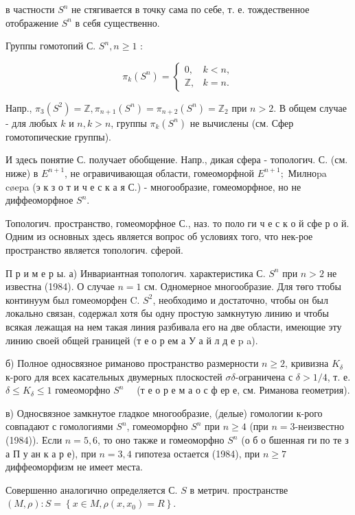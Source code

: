 \documentclass[10pt]{article}
\begin{document}
в частности $S^{n}$ не стягивается в точку сама по себе, т. е. тождественное отображение $S^{n}$ в себя существенно.



Группы гомотопий С. $S^{n}, n \geqslant 1$ :



\[

\pi_{k}\left(S^{n}\right)= \begin{cases}0, & k<n, \\ \mathbb{Z}, & k=n .\end{cases}

\]



Напр., $\pi_{3}\left(S^{2}\right)=\mathbb{Z}, \pi_{n+1}\left(S^{n}\right)=\pi_{n+2}\left(S^{n}\right)=\mathbb{Z}_{2}$ при $n>2$. В общем случае - для любых $k$ и $n, k>n$, группы $\pi_{k}\left(S^{n}\right)$ не вычислены (см. Сфер гомотопические группы).



И здесь понятие С. получает обобщение. Напр., дикая сфера - топологич. С. (см. ниже) в $E^{n+1}$, не огравичивающая области, гомеоморфной $E^{n+1} ;$ Милноpa cøepa (э к з о т и ч е с к а я С.) - многообразие, гомеоморфное, но не диффеоморфное $S^{n}$.



Топологич. пространство, гомеоморфное С., наз. то поло ги ч е с к о й сфе р о й. Одним из основных здесь является вопрос об условиях того, что нек-рое пространство является топологич. сферой.



П р и м е р ы. а) Инвариантная топологич. характеристика С. $S^{n}$ при $n>2$ не известна (1984). О случае $n=1$ см. Одномерное многообразие. Для төго ттобы континуум был гомеоморфен C. $S^{2}$, необходимо и достаточно, чтобы он был локально связан, содержал хотя бы одну простую замкнутую линию и чтобы всякая лежащая на нем такая линия разбивала его на две области, имеющие эту линию своей общей границей (т е о р ем а У а й л д е p a).



б) Полное односвязное риманово пространство размерности $n \geqslant 2$, кривизна $K_{\delta}$ к-рого для всех касательных двумерных плоскостей $\sigma \delta$-ограничена с $\delta>1 / 4$, т. е. $\delta \leqslant K_{\delta} \leqslant 1$ гомеоморфно $S^{n} \quad$ (т е о р е м а о с ф ер е, см. Риманова геометрия).



в) Односвязное замкнутое гладкое многообразие, (делые) гомологии к-рого совпадают с гомологиями $S^{n}$, гомеоморфно $S^{n}$ при $n \geqslant 4$ (при $n=3$-неизвестно (1984)). Если $n=5,6$, то оно также и гомеоморфно $S^{n}$ (о б о бшенная ги по те з а П у ан к а р е), при $n=3,4$ гипотеза остается (1984), при $n \geqslant 7$ диффеоморфизм не имеет места.



Совершенно аналогично определяется С. $S$ в метрич. пространстве $(M, \rho): S=\left\{x \in M, \rho\left(x, x_{0}\right)=R\right\}$.
\end{document}
